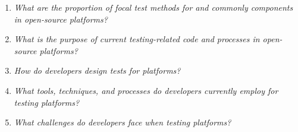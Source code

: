\begin{enumerate}[label=\textbf{RQ$_{\arabic*}$}, ref=\textbf{RQ$_{\arabic*}$}, wide, labelindent=5pt]\setlength{\itemsep}{0.2em}
	
\item{\label{rq:common} \textit{What are the proportion of focal test methods for \addons and commonly components in open-source \iot platforms?}} 
\item{\label{rq:purpose}\textit{What is the purpose of current testing-related code and processes in open-source \iot platforms?}}
\item{\label{rq:design} \textit{How do developers design tests for \iot platforms?}}
\item{\label{rq:techniques}\textit{What tools, techniques, and processes do developers currently employ for testing \iot platforms?}}
\item{\label{rq:challenges}\textit{What challenges do developers face when testing \iot platforms?}}
\end{enumerate}







